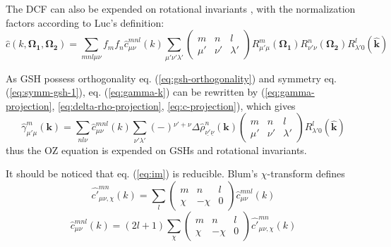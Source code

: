 The DCF can also be expended on rotational invariants \citep{Blum_I},
with the normalization factors according to Luc's definition:
\begin{equation}
\hat{c}(k,\mathbf{\Omega_{1}},\mathbf{\Omega_{2}})=\sum_{mnl\mu\nu}f_{m}f_{n}\hat{c}_{\mu\nu}^{mnl}(k)\sum_{\mu'\nu'\lambda'}\left(\begin{array}{ccc}
m & n & l\\
\mu' & \nu' & \lambda'
\end{array}\right)R_{\mu'\mu}^{m}(\mathbf{\Omega_{1}})R_{\nu'\nu}^{n}(\mathbf{\Omega_{2}})R_{\lambda'0}^{l}(\hat{\mathbf{k}})\label{eq:c-projection}
\end{equation}


As GSH possess orthogonality eq. (\ref{eq:gsh-orthogonality}) and
symmetry eq. (\ref{eq:symm-gsh-1}), eq. (\ref{eq:gamma-k}) can be
rewritten by (\ref{eq:gamma-projection}, \ref{eq:delta-rho-projection},
\ref{eq:c-projection}), which gives
\begin{equation}
\hat{\gamma}_{\mu'\mu}^{m}(\mathbf{k})=\sum_{nl\nu}\hat{c}_{\mu\nu}^{mnl}(k)\sum_{\nu'\lambda'}\left(-\right){}^{\nu'+\nu}\Delta\hat{\rho}_{\underline{\nu'}\underline{\nu}}^{n}(\mathbf{k})\left(\begin{array}{ccc}
m & n & l\\
\mu' & \nu' & \lambda'
\end{array}\right)R_{\lambda'0}^{l}(\hat{\mathbf{k}})\label{eq:im}
\end{equation}
thus the OZ equation is expended on GSHs and rotational invariants.

It should be noticed that eq. (\ref{eq:im}) is reducible. Blum's
$\chi$-transform defines\citep{Blum_II} 
\begin{equation}
\hat{c'}_{\mu\nu,\chi}^{mn}(k)=\sum_{l}\left(\begin{array}{ccc}
m & n & l\\
\chi & -\chi & 0
\end{array}\right)\hat{c}_{\mu\nu}^{mnl}(k)
\end{equation}
\begin{equation}
\hat{c}_{\mu\nu}^{mnl}(k)=\left(2l+1\right)\sum_{\chi}\left(\begin{array}{ccc}
m & n & l\\
\chi & -\chi & 0
\end{array}\right)\hat{c'}_{\mu\nu,\chi}^{mn}(k)\label{eq:c-p}
\end{equation}


